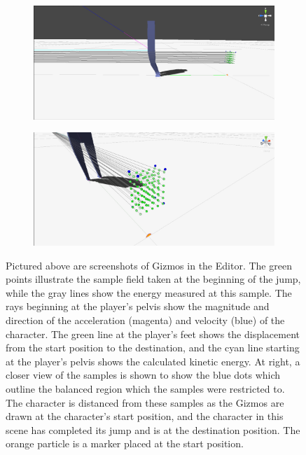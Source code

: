 \begin{figure}[ht]
	\centering
	\begin{subfigure}[b]{0.49\textwidth}
		\includegraphics[width=\textwidth]{images/gizmos1.png}
	\end{subfigure}
	\begin{subfigure}[b]{0.49\textwidth}
		\includegraphics[width=\textwidth]{images/gizmos2.png}
	\end{subfigure}
	\caption[Screenshot of Gizmos used for debug visualizations in \unity]{Pictured above are screenshots of Gizmos in the \unity Editor.  The green points illustrate the sample field taken at the beginning of the jump, while the gray lines show the energy measured at this sample.  The rays beginning at the player's pelvis show the magnitude and direction of the acceleration (magenta) and velocity (blue) of the character.  The green line at the player's feet shows the displacement from the start position to the destination, and the cyan line starting at the player's pelvis shows the calculated kinetic energy.  At right, a closer view of the samples is shown to show the blue dots which outline the balanced region which the samples were restricted to.  The character is distanced from these samples as the Gizmos are drawn at the character's start position, and the character in this scene has completed its jump and is at the destination position.  The orange particle is a marker placed at the start position.}
	\label{fig:gizmo_vis}
\end{figure}

